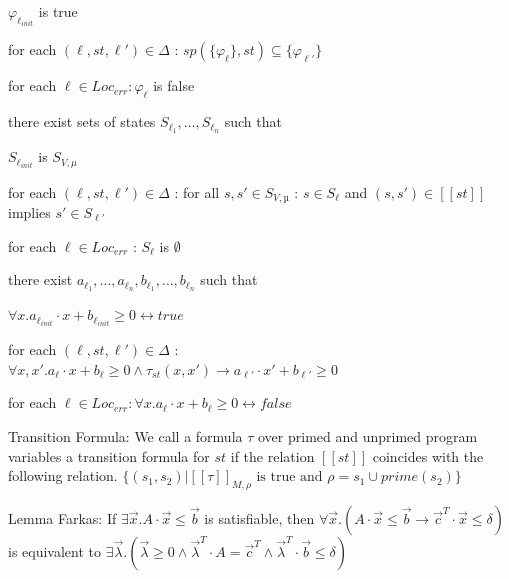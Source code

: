 \documentclass[landscape, a4paper]{article}
\begin{document}
\begin{minipage}[t]{0.2\linewidth}
\begin{betterlist}
\begin{betterlist}
\begin{betterlist}
				\item $\varphi_{\ell_{init}}$ is true
				\item for each $(\ell , st, \ell ' ) \in \Delta$ : $sp(\{ \varphi_{\ell} \} , st) \subseteq \{ \varphi_{\ell'}\}$
				\item for each $\ell \in Loc_{err} : \varphi_{\ell}$ is false
			\end{betterlist}
			\item there exist sets of states $S_{\ell_1},\ldots , S_{\ell_n}$ such that
			\begin{betterlist}
				\item $S_{\ell_{init}}$ is $S_{V,\mu}$
				\item for each $(\ell, st, \ell') \in \Delta$ : for all $s, s' \in S_{V,µ}$ : $s \in S_{\ell}$ and $(s, s') \in [[st]]$ implies $s' \in S_{\ell'}$
				\item for each $\ell \in Loc_{err}$ : $S_{\ell}$ is $\emptyset$
			\end{betterlist}
			\item there exist $a_{\ell_1},\ldots, a_{\ell_n}, b_{\ell_1},\ldots, b_{\ell_n}$ such that
			\begin{betterlist}
				\item $\forall x. a_{\ell_{init}} \cdot  x + b_{\ell_{init}} \geq 0 \leftrightarrow true$
				\item for each $(\ell, st, \ell') \in \Delta$ : $\forall x, x' . a_{\ell} \cdot  x + b_{\ell} \geq 0 \land \tau_{st}(x, x') \rightarrow a_{\ell'} \cdot x' + b_{\ell'} \geq 0$
				\item for each $\ell \in Loc_{err} : \forall x. a_{\ell} \cdot  x + b_{\ell} \geq 0 \leftrightarrow false$
			\end{betterlist}
		\end{betterlist}
		\item \alert{Transition Formula:}  We call a formula $\tau$ over primed and unprimed program variables a \alert{transition formula} for $st$ if the relation $[[st]]$ coincides with the following relation. $\{(s_1, s_2) | [[\tau]]_{M,\rho} \text{ is true and } \rho = s_1 \cup prime(s_2)\}$
		\item \alert{Lemma Farkas:} If $\exists\vec{x} . A \cdot \vec{x} \leq\vec{b}$ is satisfiable, then $\forall\vec{x} . (A \cdot \vec{x} \leq\vec{b} \rightarrow\vec{c}^T\cdot \vec{x} \leq \delta)$ is equivalent to $\exists\vec{\lambda} . ( \vec{\lambda} \geq 0 \land\vec{\lambda}^T\cdot A =\vec{c}^T\land\vec{\lambda}^T\cdot \vec{b} \leq \delta)$
	\end{betterlist}

\end{minipage}
\end{document}
